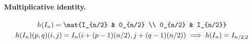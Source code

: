 \paragraph{Multiplicative identity.}
\begin{displaymath}
    \begin{gathered}
        h(I_n) = \mat{I_{n/2} & 0_{n/2} \\ 0_{n/2} & I_{n/2}} \\
        h(I_n)(p, q)(i, j) = I_n(i + (p - 1)(n / 2), j + (q - 1)(n / 2)) \implies h(I_n) = I_{n/2,2}
    \end{gathered}
\end{displaymath}